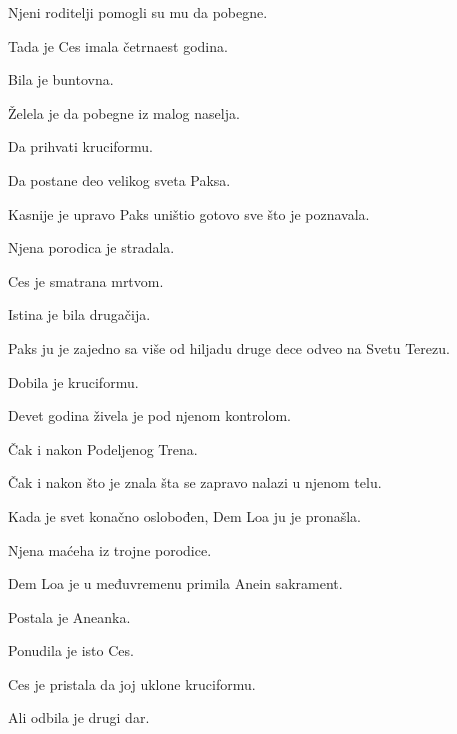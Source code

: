 Njeni roditelji pomogli su mu da pobegne.

\bigskip

Tada je Ces imala četrnaest godina.

\bigskip

Bila je buntovna.

\bigskip

Želela je da pobegne iz malog naselja.

Da prihvati kruciformu.

Da postane deo velikog sveta Paksa.

\bigskip

Kasnije je upravo Paks uništio gotovo sve što je poznavala.

\bigskip

Njena porodica je stradala.

\bigskip

Ces je smatrana mrtvom.

\bigskip

Istina je bila drugačija.

\bigskip

Paks ju je zajedno sa više od hiljadu druge dece odveo na Svetu Terezu.

\bigskip

Dobila je kruciformu.

\bigskip

Devet godina živela je pod njenom kontrolom.

\bigskip

Čak i nakon Podeljenog Trena.

\bigskip

Čak i nakon što je znala šta se zapravo nalazi u njenom telu.

\bigskip

Kada je svet konačno oslobođen, Dem Loa ju je pronašla.

\bigskip

Njena maćeha iz trojne porodice.

\bigskip

Dem Loa je u međuvremenu primila Anein sakrament.

\bigskip

Postala je Aneanka.

\bigskip

Ponudila je isto Ces.

\bigskip

Ces je pristala da joj uklone kruciformu.

\bigskip

Ali odbila je drugi dar.

